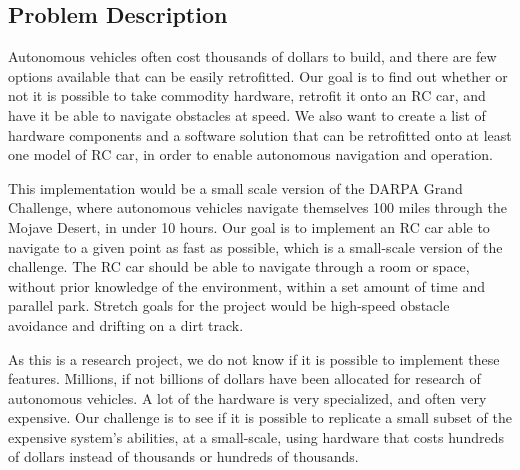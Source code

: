 \documentclass[draftclsnofoot,onecolumn,10pt]{IEEEtran}
\begin{document}
\subsection{Problem Description}
Autonomous vehicles often cost thousands of dollars to build, and there are few
options available that can be easily retrofitted. Our goal is to find out whether
or not it is possible to take commodity hardware, retrofit it onto an RC car, and
have it be able to navigate obstacles at speed. We also want to create a list of
hardware components and a software solution that can be retrofitted onto at least
one model of RC car, in order to enable autonomous navigation and operation.\par
This implementation would be a small scale version of the DARPA Grand Challenge,
where autonomous vehicles navigate themselves 100 miles through the Mojave Desert,
in under 10 hours. Our goal is to implement an RC car able to navigate to a given
point as fast as possible, which is a small-scale version of the challenge. The RC
car should be able to navigate through a room or space, without prior knowledge of
the environment, within a set amount of time and parallel park. Stretch goals for
the project would be high-speed obstacle avoidance and drifting on a dirt track.\par
As this is a research project, we do not know if it is possible to implement 
these features. Millions, if not billions of dollars have been allocated for
research of autonomous vehicles. A lot of the hardware is very specialized, and
often very expensive. Our challenge is to see if it is possible to replicate a small
subset of the expensive system's abilities, at a small-scale, using hardware that costs 
hundreds of dollars instead of thousands or hundreds of thousands. 
\end{document}
